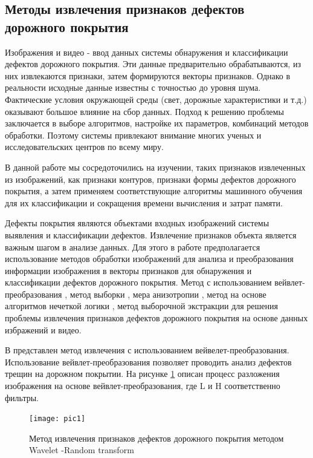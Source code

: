\documentclass[a4paper,14pt]{extreport}
\begin{document}
\subsection{Методы извлечения признаков дефектов дорожного покрытия}
Изображения и видео - ввод данных системы обнаружения и классификации дефектов дорожного покрытия. Эти данные предварительно обрабатываются, из них извлекаются признаки, затем формируются векторы признаков. Однако в реальности исходные данные известны с точностью до уровня шума. Фактические условия окружающей среды (свет, дорожные характеристики и т.д.) оказывают большое влияние на сбор данных. Подход к решению проблемы заключается в выборе алгоритмов, настройке их параметров, комбинаций методов обработки. Поэтому системы привлекают внимание многих ученых и исследовательских центров по всему миру.

В данной работе мы сосредоточились на изучении, таких признаков извлеченных из изображений, как признаки контуров, признаки формы дефектов дорожного покрытия, а затем применяем соответствующие алгоритмы машинного обучения для их классификации и сокращения времени вычисления и затрат памяти.

Дефекты покрытия являются объектами входных изображений системы выявления и классификации дефектов. Извлечение признаков объекта является важным шагом в анализе данных. Для этого в работе предполагается использование методов обработки изображений для анализа и преобразования информации изображения в векторы признаков для обнаружения и классификации дефектов дорожного покрытия. Метод с использованием вейвлет-преобразования \cite{h61}, метод выборки \cite{h62}, мера анизотропии \cite{h63}, метод на основе алгоритмов нечеткой логики \cite{h64}, метод выборочной экстракции \cite{h65} для решения проблемы извлечения признаков дефектов дорожного покрытия на основе данных избражений и видео.

В \cite{h108} представлен метод извлечения с использованием вейвелет-преобразования. Использование вейвлет-преобразования позволяет проводить анализ дефектов трещин на дорожном покрытии. На рисунке \ref{pic1} описан процесс разложения изображения на основе вейвлет-преобразования, где L и H соответственно фильтры.
\begin{figure}[ht!]
\centering
\texttt{[image: pic1]}
\caption{Метод извлечения признаков дефектов дорожного покрытия методом Wavelet -Random transform \cite{h108}}
	\label{pic1}
	\end{figure}
	
\end{document}

